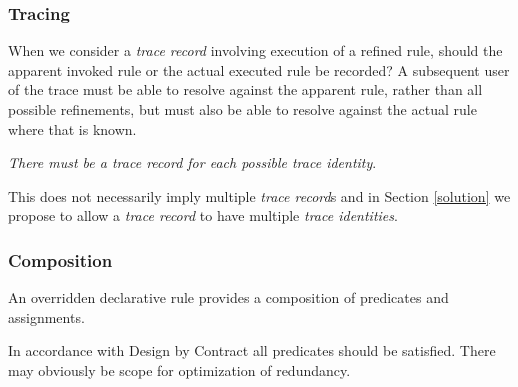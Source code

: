\documentclass[runningheads,a4paper]{llncs}
\begin{document}




 

\subsubsection{Tracing}

When we consider a \emph{trace record} involving execution of  a refined rule, should the apparent invoked rule or the actual executed rule be recorded? A subsequent user of the trace must be able to resolve against the apparent rule, rather than all possible refinements, but must also be able to resolve against the actual rule where that is known. 

\emph{There must be a trace record for each possible trace identity}.

This does not necessarily imply multiple \emph{trace record}s and in Section \ref{solution} we propose to allow a \emph{trace record} to have multiple \emph{trace identities}.

\subsubsection{Composition}

An overridden declarative rule provides a composition of predicates and assignments.

In accordance with Design by Contract\cite{dBc} all predicates should be satisfied. There may obviously be scope for optimization of redundancy.
\end{document}
